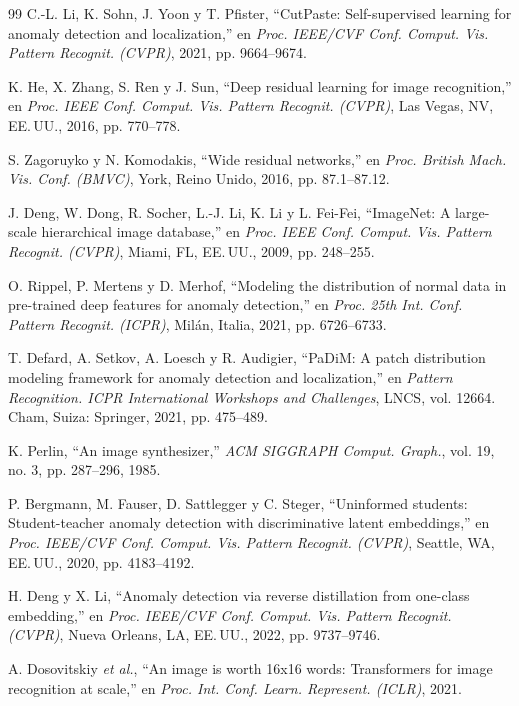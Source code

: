 \documentclass[12pt,oneside]{report}
\begin{document}
\begin{thebibliography}{99}
 C.-L. Li, K. Sohn, J. Yoon y T. Pfister, ``CutPaste: Self-supervised learning for anomaly detection and localization,'' en \textit{Proc. IEEE/CVF Conf. Comput. Vis. Pattern Recognit. (CVPR)}, 2021, pp. 9664--9674.

 K. He, X. Zhang, S. Ren y J. Sun, ``Deep residual learning for image recognition,'' en \textit{Proc. IEEE Conf. Comput. Vis. Pattern Recognit. (CVPR)}, Las Vegas, NV, EE.\,UU., 2016, pp. 770--778.

 S. Zagoruyko y N. Komodakis, ``Wide residual networks,'' en \textit{Proc. British Mach. Vis. Conf. (BMVC)}, York, Reino Unido, 2016, pp. 87.1--87.12.

 J. Deng, W. Dong, R. Socher, L.-J. Li, K. Li y L. Fei-Fei, ``ImageNet: A large-scale hierarchical image database,'' en \textit{Proc. IEEE Conf. Comput. Vis. Pattern Recognit. (CVPR)}, Miami, FL, EE.\,UU., 2009, pp. 248--255.

 O. Rippel, P. Mertens y D. Merhof, ``Modeling the distribution of normal data in pre-trained deep features for anomaly detection,'' en \textit{Proc. 25th Int. Conf. Pattern Recognit. (ICPR)}, Milán, Italia, 2021, pp. 6726--6733.

 T. Defard, A. Setkov, A. Loesch y R. Audigier, ``PaDiM: A patch distribution modeling framework for anomaly detection and localization,'' en \textit{Pattern Recognition. ICPR International Workshops and Challenges}, LNCS, vol. 12664. Cham, Suiza: Springer, 2021, pp. 475--489.

 K. Perlin, ``An image synthesizer,'' \textit{ACM SIGGRAPH Comput. Graph.}, vol. 19, no. 3, pp. 287--296, 1985.

 P. Bergmann, M. Fauser, D. Sattlegger y C. Steger, ``Uninformed students: Student-teacher anomaly detection with discriminative latent embeddings,'' en \textit{Proc. IEEE/CVF Conf. Comput. Vis. Pattern Recognit. (CVPR)}, Seattle, WA, EE.\,UU., 2020, pp. 4183--4192.

 H. Deng y X. Li, ``Anomaly detection via reverse distillation from one-class embedding,'' en \textit{Proc. IEEE/CVF Conf. Comput. Vis. Pattern Recognit. (CVPR)}, Nueva Orleans, LA, EE.\,UU., 2022, pp. 9737--9746.

 A. Dosovitskiy \textit{et al.}, ``An image is worth 16x16 words: Transformers for image recognition at scale,'' en \textit{Proc. Int. Conf. Learn. Represent. (ICLR)}, 2021.


\end{thebibliography}
\end{document}
